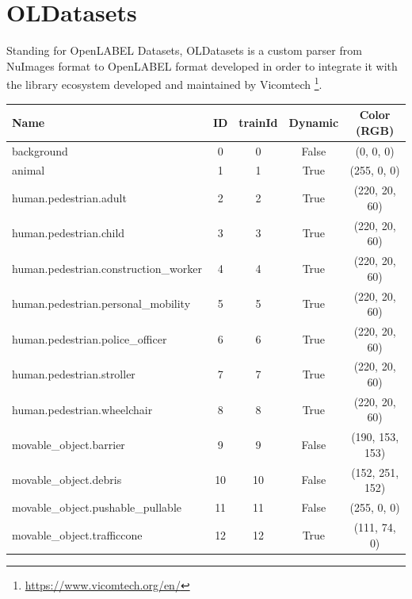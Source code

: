 \section{OLDatasets} \label{appendix:OLDatasets}

Standing for OpenLABEL Datasets, OLDatasets is a custom parser from NuImages format to OpenLABEL format developed in order to integrate it with the  library ecosystem developed and maintained by Vicomtech \footnote{\url{https://www.vicomtech.org/en/}}.

\begin{table}[h]
    \centering
    \begin{tabular}{l c c c c}
        \toprule
        \textbf{Name} & \textbf{ID} & \textbf{trainId} & \textbf{Dynamic} & \textbf{Color (RGB)} \\
        \midrule
        background                          & 0  & 0  & False & (0, 0, 0) \\
        animal                              & 1  & 1  & True  & (255, 0, 0) \\
        human.pedestrian.adult              & 2  & 2  & True  & (220, 20, 60) \\
        human.pedestrian.child              & 3  & 3  & True  & (220, 20, 60) \\
        human.pedestrian.construction\_worker & 4  & 4  & True  & (220, 20, 60) \\
        human.pedestrian.personal\_mobility & 5  & 5  & True  & (220, 20, 60) \\
        human.pedestrian.police\_officer    & 6  & 6  & True  & (220, 20, 60) \\
        human.pedestrian.stroller           & 7  & 7  & True  & (220, 20, 60) \\
        human.pedestrian.wheelchair         & 8  & 8  & True  & (220, 20, 60) \\
        movable\_object.barrier             & 9  & 9  & False & (190, 153, 153) \\
        movable\_object.debris              & 10 & 10 & False & (152, 251, 152) \\
        movable\_object.pushable\_pullable  & 11 & 11 & False & (255, 0, 0) \\
        movable\_object.trafficcone         & 12 & 12 & True  & (111, 74, 0) \\

\end{tabular}
\end{table}
